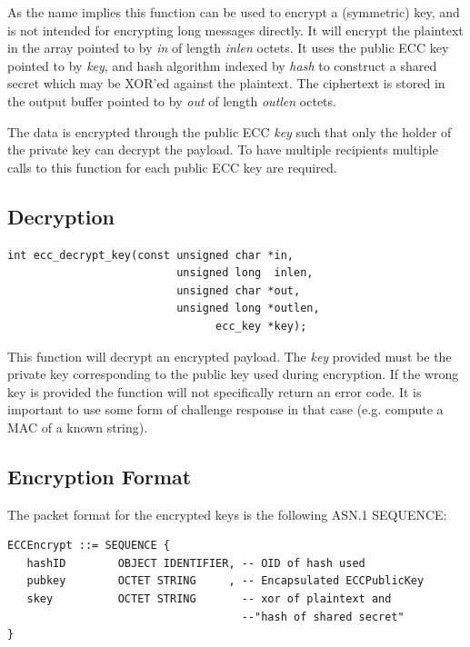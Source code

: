 \documentclass[synpaper]{book}
\begin{document}
As the name implies this function can be used to encrypt a (symmetric) key, and is not intended for encrypting long messages directly.  It will encrypt the
plaintext in the array pointed to by \textit{in} of length \textit{inlen} octets.  It uses the public ECC key pointed to by \textit{key}, and
hash algorithm indexed by \textit{hash} to construct a shared secret which may be XOR'ed against the plaintext.  The ciphertext is stored in
the output buffer pointed to by \textit{out} of length \textit{outlen} octets.

The data is encrypted through the public ECC \textit{key} such that only the holder of the private key can decrypt the payload.
To have multiple recipients multiple calls to this function for each public ECC key are required.

\subsection{Decryption}
\begin{verbatim}
int ecc_decrypt_key(const unsigned char *in,
                          unsigned long  inlen,
                          unsigned char *out,
                          unsigned long *outlen,
                                ecc_key *key);
\end{verbatim}

This function will decrypt an encrypted payload.  The \textit{key} provided must be the private key corresponding to the public key
used during encryption.  If the wrong key is provided the function will not specifically return an error code.  It is important
to use some form of challenge response in that case (e.g. compute a MAC of a known string).

\subsection{Encryption Format}
The packet format for the encrypted keys is the following ASN.1 SEQUENCE:

\begin{verbatim}
ECCEncrypt ::= SEQUENCE {
   hashID        OBJECT IDENTIFIER, -- OID of hash used
   pubkey        OCTET STRING     , -- Encapsulated ECCPublicKey
   skey          OCTET STRING       -- xor of plaintext and
                                    --"hash of shared secret"
}
\end{verbatim}
\end{document}
